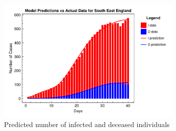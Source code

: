 \documentclass[12pt]{article}
\begin{document}
\begin{figure}
    \centering
    \includegraphics[width=0.8\textwidth]{images/ude/South East England_infected_death_data.pdf}
    \caption{Predicted number of infected and deceased individuals}
    \label{fig:ude_South East England}
\end{figure}
\end{document}

